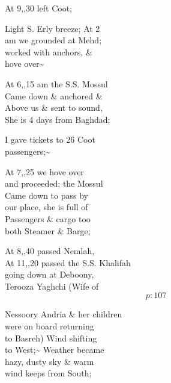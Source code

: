 \documentclass{report}
\begin{document}
	\par{
 	At 9,,30 left Coot;\ \\
	}

	\par{
 	Light S. Erly breeze; At 2\ \\am we grounded at Mehd;\ \\worked with anchors, \&\ \\hove over\~{}\ \\
	}

	\par{
 	At 6,,15 am the S.S. Mossul\ \\Came down \& anchored \&\ \\Above us \& sent to sound,\ \\She is 4 days from Baghdad;\ \\
	}

	\par{
 	I gave tickets to 26 Coot\ \\passengers;\~{}\ \\
	}

	\par{
 	At 7,,25 we hove over\ \\and proceeded; the Mossul\ \\Came down to pass by\ \\our place, she is full of\ \\Passengers \& cargo too\ \\both Steamer \& Barge;\ \\
	}

	\par{
 	At 8,,40 passed Nemlah,\ \\At 11,,20 passed the S.S. Khalifah\ \\going down at Deboony,\ \\Terooza Yaghchi (Wife of\ \\
  \[p: 107 \]

	}



	\par{
 	Nessoory Andria \& her children\ \\were on board returning\ \\to Basreh) Wind shifting\ \\to West;\~{} Weather became\ \\hazy, dusty sky \& warm\ \\wind keeps from South;\ \\
	}
\end{document}
